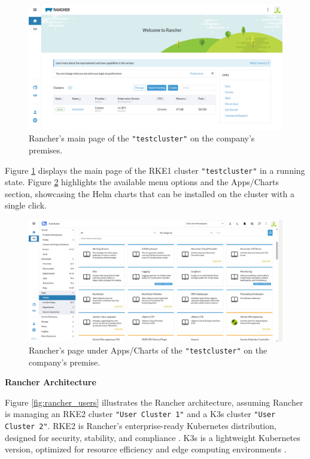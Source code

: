 \documentclass[../main.tex]{subfiles}
\begin{document}
\begin{figure}[H]
    \centering
    \includegraphics[scale=0.4]{img/3-background/rancher/rancher-gui.png}
    \caption{Rancher’s main page of the \texttt{"testcluster"} on the company's premises.}
    \label{fig:rancher_gui}
\end{figure}

Figure \ref{fig:rancher_gui} displays the main page of the RKE1 cluster \texttt{"testcluster"} in a running state. Figure \ref{fig:rancher_gui_apps} highlights the available menu options and the Apps/Charts section, showcasing the Helm charts that can be installed on the cluster with a single click.
\begin{figure}[H]
    \centering
    \includegraphics[scale=0.4]{img/3-background/rancher/rancher_gui_apps.png}
    \caption{Rancher’s page under Apps/Charts of the \texttt{"testcluster"} on the company's premise.}
    \label{fig:rancher_gui_apps}
\end{figure}

\textbf{Rancher Architecture}

Figure \ref{fig:rancher_users} illustrates the Rancher architecture, assuming Rancher is managing an RKE2 cluster \texttt{"User Cluster 1"} and a K3s cluster \texttt{"User Cluster 2"}.
RKE2 is Rancher's enterprise-ready Kubernetes distribution, designed for security, stability, and compliance \cite{rke2}. K3s is a lightweight Kubernetes version, optimized for resource efficiency and edge computing environments \cite{K3s}.
\end{document}
